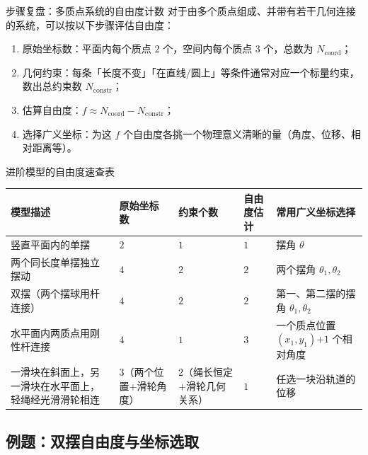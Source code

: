 \documentclass[a4paper,11pt]{ctexart}
\begin{document}
\begin{notebox}{步骤复盘：多质点系统的自由度计数}
  对于由多个质点组成、并带有若干几何连接的系统，可以按以下步骤评估自由度：
  \begin{enumerate}
    \item 原始坐标数：平面内每个质点 $2$ 个，空间内每个质点 $3$ 个，总数为 $N_{\text{coord}}$；
    \item 几何约束：每条「长度不变」「在直线/圆上」等条件通常对应一个标量约束，数出总约束数 $N_{\text{constr}}$；
    \item 估算自由度：$f \approx N_{\text{coord}} - N_{\text{constr}}$；
    \item 选择广义坐标：为这 $f$ 个自由度各挑一个物理意义清晰的量（角度、位移、相对距离等）。
  \end{enumerate}
\end{notebox}

\begin{summarybox}{进阶模型的自由度速查表}
  \renewcommand{\arraystretch}{1.3}
  \begin{tabularx}{0.98\textwidth}{X>{\centering\arraybackslash}p{1.9cm}>{\centering\arraybackslash}p{1.9cm}>{\centering\arraybackslash}p{1.9cm}X}
    \toprule
    模型描述 & 原始坐标数 & 约束个数 & 自由度估计 & 常用广义坐标选择 \\
    \midrule
    竖直平面内的单摆 & $2$ & $1$ & $1$ & 摆角 $\theta$ \\
    两个同长度单摆独立摆动 & $4$ & $2$ & $2$ & 两个摆角 $\theta_1,\theta_2$ \\
    双摆（两个摆球用杆连接） & $4$ & $2$ & $2$ & 第一、第二摆的摆角 $\theta_1,\theta_2$ \\
    水平面内两质点用刚性杆连接 & $4$ & $1$ & $3$ & 一个质点位置 $(x_1,y_1)$+$1$ 个相对角度 \\
    一滑块在斜面上，另一滑块在水平面上，轻绳经光滑滑轮相连 & $3$（两个位置+滑轮角度） & $2$（绳长恒定+滑轮几何关系） & $1$ & 任选一块沿轨道的位移 \\
    \bottomrule
  \end{tabularx}
\end{summarybox}

\subsection{例题：双摆自由度与坐标选取}
\end{document}
